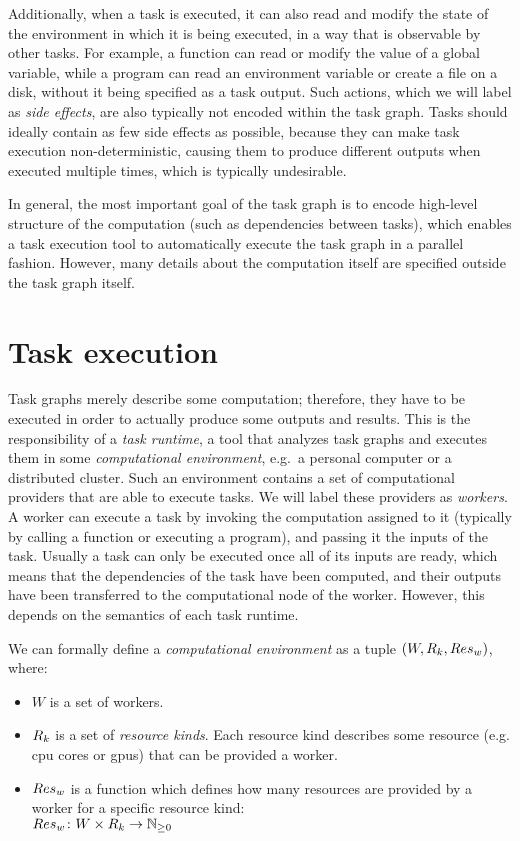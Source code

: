 Additionally, when a task is executed, it can also read and modify the state of the environment in
which it is being executed, in a way that is observable by other tasks. For example, a function can
read or modify the value of a global variable, while a program can read an environment variable or
create a file on a disk, without it being specified as a task output. Such actions, which we will
label as \emph{side effects}, are also typically not encoded within the task graph. Tasks should
ideally contain as few side effects as possible, because they can make task execution
non-deterministic, causing them to produce different outputs when executed multiple times, which is
typically undesirable.

In general, the most important goal of the task graph is to encode high-level structure of the
computation (such as dependencies between tasks), which enables a task execution tool to
automatically execute the task graph in a parallel fashion. However, many details about the
computation itself are specified outside the task graph itself.

\section{Task execution}
Task graphs merely describe some computation; therefore, they have to be executed in order to
actually produce some outputs and results. This is the responsibility of a \emph{task runtime},
a tool that analyzes task graphs and executes them in some \emph{computational environment}, e.g.\ a personal
computer or a distributed cluster. Such an environment contains a set of computational providers
that are able to execute tasks. We will label these providers as \emph{workers}. A worker
can execute a task by invoking the computation assigned to it (typically by calling a function or
executing a program), and passing it the inputs of the task. Usually a task can only be executed
once all of its inputs are ready, which means that the dependencies of the task have been computed,
and their outputs have been transferred to the computational node of the worker. However, this
depends on the semantics of each task runtime.

We can formally define a \emph{computational environment} as a tuple $(W, R_k, Res_w)$, where:
\begin{itemize}[itemsep=0pt]
	\item $W$ is a set of workers.
	\item $R_k$ is a set of \emph{resource kinds}. Each resource kind describes some
	      resource (e.g. \gls{cpu} cores or \glspl{gpu}) that can be provided a
	      worker.
	\item[\makedef{def:worker_resources}] $Res_w$ is a function which defines how many resources are
		provided by a worker for a specific resource kind: \\ $Res_w\colon W \times R_k \rightarrow
			\mathbb{N}_{\geq{}0}$
\end{itemize}

